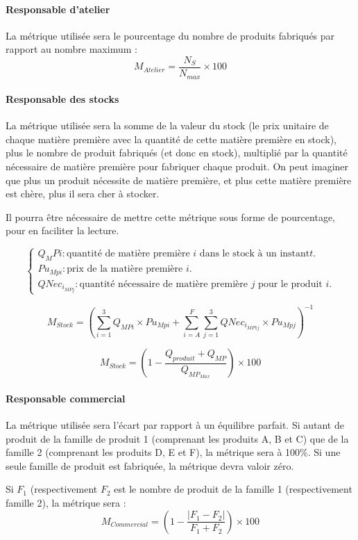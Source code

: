 \paragraph{Responsable d'atelier}
La métrique utilisée sera le pourcentage du nombre de produits fabriqués par
rapport au nombre maximum :
$$
M_{Atelier} = \frac{N_{S}}{N_{max}} \times 100
$$

\paragraph{Responsable des stocks}
La métrique utilisée sera la somme de la valeur du stock (le prix unitaire
de chaque matière première avec la quantité de cette matière
première en stock), plus le nombre de produit fabriqués (et donc en stock),
multiplié par la quantité nécessaire de matière première pour fabriquer chaque
produit. On peut imaginer que plus un produit nécessite de matière première, et
plus cette matière première est chère, plus il sera cher à stocker.

Il pourra être nécessaire de mettre cette métrique sous forme de pourcentage,
pour en faciliter la lecture.

$$
\begin{cases}
    Q_MPi : \text{quantité de matière première } i \text{ dans le stock à un instant} t.\\
    Pu_{Mpi} : \text{prix de la matière première } i.\\
    QNec_{i_{MPj}} : \text{quantité nécessaire de matière première $j$ pour le produit $i$.}
\end{cases}
$$

$$
M_{Stock} =  \left( 
	     \sum_{i=1}^{3} Q_{MPi} \times Pu_{Mpi} + 
	     \sum_{i=A}^{F} \sum_{j=1}^{3} QNec_{i_{MP1j}} \times Pu_{Mpj}
	     \right)^{-1}
$$

$$
M_{Stock} = \left(
	    1 - \frac{Q_{produit} + Q_{MP}}{Q_{MP_{Max}}} 
	    \right) \times 100
$$
\paragraph{Responsable commercial}
La métrique utilisée sera l'écart par rapport à un équilibre parfait.
Si autant de produit de la famille de produit 1 (comprenant les produits A, B
et C) que de la famille 2 (comprenant les produits D, E et F), la métrique sera
à 100\%.
Si une seule famille de produit est fabriquée, la métrique devra valoir zéro.

Si $F_1$ (respectivement $F_2$ est le nombre de produit de la famille 1
(respectivement famille 2), la métrique sera :
$$
M_{Commercial} = \left( 1 - \frac{|F_1 - F_2|}{F_1 + F_2} \right) \times 100
$$

